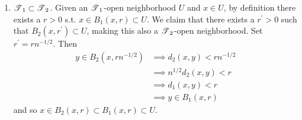 \begin{solution}[Munkres 20.1.a]
\begin{enumerate}
      \item $\T_1 \subset \T_2$. Given an $\T_1$-open neighborhood $U$ and $x \in U$, by definition there exists a $r > 0$ s.t. $x \in B_1 (x, r) \subset U$. We claim that there exists a $r^\prime > 0$ such that $B_2 (x, r^\prime) \subset U$, making this also a $\T_2$-open neighborhood. Set $r^\prime = r n^{-1/2}$. Then 
      \begin{align}
        y \in B_2 (x, r n^{-1/2}) & \implies d_2 (x, y) < r n^{-1/2} \\
                                  & \implies n^{1/2} d_2 (x, y) < r \\ 
                                  & \implies d_1 (x, y) < r \\
                                  & \implies y \in B_1 (x, r) 
      \end{align}
      and so $x \in B_2 (x, r) \subset B_1 (x, r) \subset U$. 
    \end{enumerate}  
  \end{solution}

